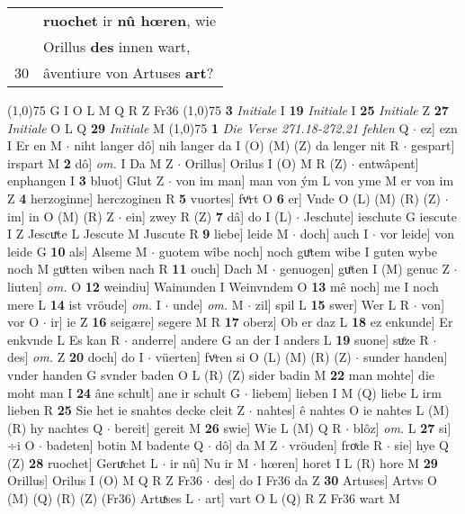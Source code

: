 \documentclass[8pt,a4paper,notitlepage]{article}
\begin{document}
\begin{table}[ht]
\begin{minipage}[t]{0.5\linewidth}
\begin{tabular}{rl}
 & \textbf{ruochet} ir \textbf{nû hœren}, wie\\ 
 & Orillus \textbf{des} innen wart,\\ 
30 & âventiure von Artuses \textbf{art}?\\ 
\end{tabular}
\scriptsize
\line(1,0){75} \newline
G I O L M Q R Z Fr36 \newline
\line(1,0){75} \newline
\textbf{3} \textit{Initiale} I  \textbf{19} \textit{Initiale} I  \textbf{25} \textit{Initiale} Z  \textbf{27} \textit{Initiale} O L Q  \textbf{29} \textit{Initiale} M  \newline
\line(1,0){75} \newline
\textbf{1} \textit{Die Verse 271.18-272.21 fehlen} Q   $\cdot$ ez] ezn I Er en M  $\cdot$ niht langer dô] nih langer da I (O) (M) (Z) da lenger nit R  $\cdot$ gespart] irspart M \textbf{2} dô] \textit{om.} I Da M Z  $\cdot$ Orillus] Orilus I (O) M R (Z)  $\cdot$ entwâpent] enphangen I \textbf{3} bluot] Glut Z  $\cdot$ von im man] man von ým L von yme M er von im Z \textbf{4} herzoginne] herczoginen R \textbf{5} vuortes] fvͦrt O \textbf{6} er] Vnde O (L) (M) (R) (Z)  $\cdot$ im] in O (M) (R) Z  $\cdot$ ein] zwey R (Z) \textbf{7} dâ] do I (L)  $\cdot$ Jeschute] ieschute G iescute I Z Jescuͯte L Jescute M Juscute R \textbf{9} liebe] leide M  $\cdot$ doch] auch I  $\cdot$ vor leide] von leide G \textbf{10} als] Alseme M  $\cdot$ guotem wîbe noch] noch guͤtem wibe I guten wybe noch M guͦtten wiben nach R \textbf{11} ouch] Dach M  $\cdot$ genuogen] guͤten I (M) genuc Z  $\cdot$ liuten] \textit{om.} O \textbf{12} weindiu] Wainunden I Weinvndem O \textbf{13} mê noch] me I noch mere L \textbf{14} ist vröude] \textit{om.} I  $\cdot$ unde] \textit{om.} M  $\cdot$ zil] spil L \textbf{15} swer] Wer L R  $\cdot$ von] vor O  $\cdot$ ir] ie Z \textbf{16} seigære] segere M R \textbf{17} oberz] Ob er daz L \textbf{18} ez enkunde] Er enkvnde L Es kan R  $\cdot$ anderre] andere G an der I anders L \textbf{19} suone] suͦze R  $\cdot$ des] \textit{om.} Z \textbf{20} doch] do I  $\cdot$ vüerten] fvͦren si O (L) (M) (R) (Z)  $\cdot$ sunder handen] vnder handen G svnder baden O L (R) (Z) sider badin M \textbf{22} man mohte] die moht man I \textbf{24} âne schult] ane ir schult G  $\cdot$ liebem] lieben I M (Q) liebe L irm lieben R \textbf{25} Sie het ie snahtes decke cleit Z  $\cdot$ nahtes] ê nahtes O ie nahtes L (M) (R) hy nachtes Q  $\cdot$ bereit] gereit M \textbf{26} swie] Wie L (M) Q R  $\cdot$ blôz] \textit{om.} L \textbf{27} si] ÷i O  $\cdot$ badeten] botin M badente Q  $\cdot$ dô] da M Z  $\cdot$ vröuden] froͯde R  $\cdot$ sie] hye Q (Z) \textbf{28} ruochet] Geruͯchet L  $\cdot$ ir nû] Nu ir M  $\cdot$ hœren] horet I L (R) hore M \textbf{29} Orillus] Orilus I (O) M Q R Z Fr36  $\cdot$ des] do I Fr36 da Z \textbf{30} Artuses] Artvs O (M) (Q) (R) (Z) (Fr36) Artuͯses L  $\cdot$ art] vart O L (Q) R Z Fr36 wart M \newline

\end{minipage}
\end{table}
\end{document}
